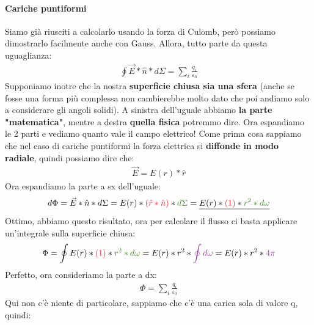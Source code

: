                 \paragraph{Cariche puntiformi}
                    Siamo già riusciti a calcolarlo usando la forza di Culomb, però possiamo dimostrarlo facilmente anche con Gauss. Allora, tutto parte da questa uguaglianza:
                    \begin{align*}
                        \oint\vec{E}*\hat{n}*d\Sigma = \sum_i\frac{q_i}{\varepsilon_0}
                    \end{align*}
                    Supponiamo inotre che la nostra \textbf{superficie chiusa sia una sfera} (anche se fosse una forma più complessa non cambierebbe molto dato che poi andiamo solo a considerare gli angoli solidi). 
                    A sinistra dell'uguale abbiamo \textbf{la parte "matematica"}, mentre a destra \textbf{quella fisica} potremmo dire. Ora espandiamo le 2 parti e vediamo quanto vale il campo elettrico! Come prima cosa sappiamo che nel caso di cariche puntiformi la forza elettrica si \textbf{diffonde in modo radiale}, quindi possiamo dire che:
                    \begin{align*}
                        \vec{E}=E(r)*\hat{r}
                    \end{align*}
                    Ora espandiamo la parte a sx dell'uguale:
                    \begin{align*}
                        d\Phi=\vec{E}*\hat{n}*d\Sigma = E(r)*\textcolor{Red}{(\hat{r}*\hat{n})}*\textcolor{OliveGreen}{d\Sigma} = \underline{E(r)*\textcolor{Red}{(1)}*\textcolor{OliveGreen}{r^2*d\omega}}
                    \end{align*}
                    Ottimo, abbiamo questo risultato, ora per calcolare il flusso ci basta applicare un'integrale sulla superficie chiusa:
                    \begin{align*}
                        \Phi = \oint E(r)*\textcolor{Red}{(1)}*\textcolor{OliveGreen}{r^2*d\omega} = E(r)*r^2*\textcolor{Purple}{\oint d\omega} = E(r)*r^2*\textcolor{Purple}{4\pi}
                    \end{align*}
                    Perfetto, ora consideriamo la parte a dx:
                    \begin{align*}
                        \Phi = \sum_i\frac{q_i}{\varepsilon_0}
                    \end{align*}
                    Qui non c'è niente di particolare, sappiamo che c'è una carica sola di valore q, quindi:
